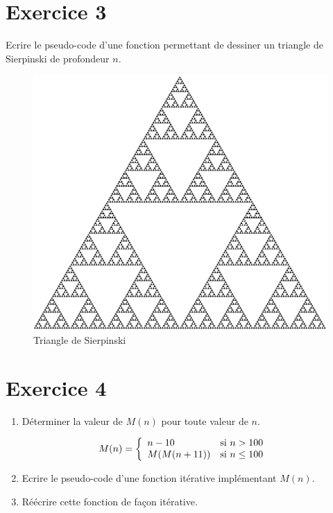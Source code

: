 \documentclass[a4paper,10pt]{article}
\begin{document}
\section*{Exercice 3}

Ecrire le pseudo-code d'une fonction permettant de dessiner un triangle de Sierpinski de profondeur $n$.

\begin{figure}
    \center
    \includegraphics[scale=0.25]{triangle.png}
    \caption{Triangle de Sierpinski}
\end{figure}

\section*{Exercice 4}

\begin{enumerate}

\item Déterminer la valeur de $M(n)$ pour toute valeur de $n$.

\begin{align*}
M(n) &= \left\{
    \begin{array}{l l}
        n - 10 & \text{si } n > 100 \\
        M(M(n+11)) & \text{si } n \leq 100\\
    \end{array} \right.
\end{align*}

\item Ecrire le pseudo-code d'une fonction itérative implémentant $M(n)$.
\item Réécrire cette fonction de façon itérative.

\end{enumerate}
\end{document}
